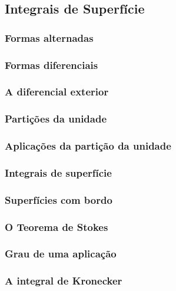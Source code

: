 \documentclass{article}
\theoremstyle{plain}
\theoremstyle{definition}
\theoremstyle{remark}
\begin{document}
\subsection{ Integrais de Superfície}
   \subsubsection{Formas alternadas}
   \subsubsection{Formas diferenciais}
   \subsubsection{A diferencial exterior}
   \subsubsection{Partições da unidade}
   \subsubsection{Aplicações da partição da unidade}
   \subsubsection{Integrais de superfície}
   \subsubsection{Superfícies com bordo}
   \subsubsection{O Teorema de Stokes}
   \subsubsection{Grau de uma aplicação}
   \subsubsection{ A integral de Kronecker}
\end{document}
